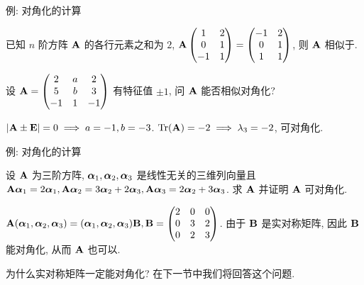 \begin{frame}{例: 对角化的计算}
	\onslide<+->
	\begin{example}
		已知 $n$ 阶方阵 ${\mathbf{A}}$ 的各行元素之和为 $2$, ${\mathbf{A}}\begin{pmatrix}
			1&2\\
			0&1\\
			-1&1
		\end{pmatrix}=\begin{pmatrix}
			-1&2\\
			0&1\\
			1&1
		\end{pmatrix}$, 则 ${\mathbf{A}}$ 相似于.
	\end{example}
	\onslide<+->
	\begin{exercise}
		设 ${\mathbf{A}}=\begin{pmatrix}
			2&a&2\\
			5&b&3\\
			-1&1&-1
		\end{pmatrix}$ 有特征值 $\pm1$, 问 ${\mathbf{A}}$ 能否相似对角化?
	\end{exercise}
	\onslide<+->
	\begin{answer}
		$|{\mathbf{A}}\pm{\mathbf{E}}|=0\implies a=-1,b=-3$.
		${\mathrm{Tr}}({\mathbf{A}})=-2\implies\lambda_3=-2$, 可对角化.
	\end{answer}
\end{frame}


\begin{frame}{例: 对角化的计算}
	\onslide<+->
	\begin{example}
		设 ${\mathbf{A}}$ 为三阶方阵, ${\boldsymbol{\alpha}}_1,{\boldsymbol{\alpha}}_2,{\boldsymbol{\alpha}}_3$ 是线性无关的三维列向量且 ${\mathbf{A}}{\boldsymbol{\alpha}}_1=2{\boldsymbol{\alpha}}_1,{\mathbf{A}}{\boldsymbol{\alpha}}_2=3{\boldsymbol{\alpha}}_2+2{\boldsymbol{\alpha}}_3,{\mathbf{A}}{\boldsymbol{\alpha}}_3=2{\boldsymbol{\alpha}}_2+3{\boldsymbol{\alpha}}_3$.
		求 ${\mathbf{A}}$ 并证明 ${\mathbf{A}}$ 可对角化.
	\end{example}
	\onslide<+->
	\begin{solution}
		${\mathbf{A}}({\boldsymbol{\alpha}}_1,{\boldsymbol{\alpha}}_2,{\boldsymbol{\alpha}}_3)=({\boldsymbol{\alpha}}_1,{\boldsymbol{\alpha}}_2,{\boldsymbol{\alpha}}_3){\mathbf{B}},{\mathbf{B}}=\begin{pmatrix}
			2&0&0\\
			0&3&2\\
			0&2&3
		\end{pmatrix}$.
		由于 ${\mathbf{B}}$ 是实对称矩阵, 因此 ${\mathbf{B}}$ 能对角化, 从而 ${\mathbf{A}}$ 也可以.
	\end{solution}
	\onslide<+->
	为什么实对称矩阵一定能对角化?
	在下一节中我们将回答这个问题.
\end{frame}


